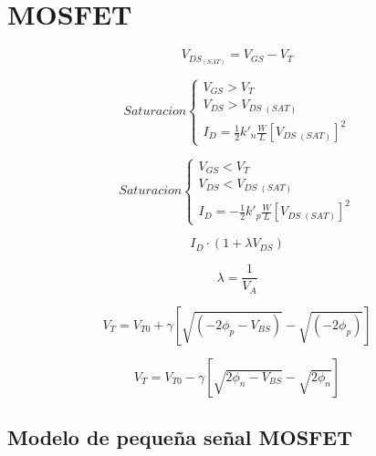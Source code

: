 \section{MOSFET}
\begin{equation}
    V_{DS_{(SAT)}} = V_{GS} - V_T 
\end{equation}


\begin{equation*}
    Saturacion\begin{cases}
    V_{GS} > V_T \\
    V_{DS} > V_{DS\;(SAT)} \\
    I_D = \frac{1}{2}k'_n\frac{W}{L}\left[V_{DS\;(SAT)}\right]^2
\end{cases}
\end{equation*}


\begin{equation*}
    Saturacion\begin{cases}
    V_{GS} < V_T \\
    V_{DS} < V_{DS\;(SAT)} \\
    I_D = -\frac{1}{2}k'_p\frac{W}{L}\left[V_{DS\;(SAT)}\right]^2
\end{cases}
\end{equation*}

\begin{equation}
    I_D \cdot (1+\lambda V_{DS})
\end{equation}

\begin{equation}
    \lambda = \frac{1}{V_A}
\end{equation}

\begin{equation}
    V_{T} = V_{T0} + \gamma{\left[\sqrt{\left(-2\phi_p - V_{BS}\right)} - \sqrt{\left( -2\phi_p\right)}  \right]} 
\end{equation}

\begin{equation}
    V_{T} = V_{T0} - \gamma{\left[\sqrt{2\phi_n - V_{BS}} - \sqrt{2\phi_n}\right]} 
\end{equation}

\subsection{Modelo de pequeña señal MOSFET}


